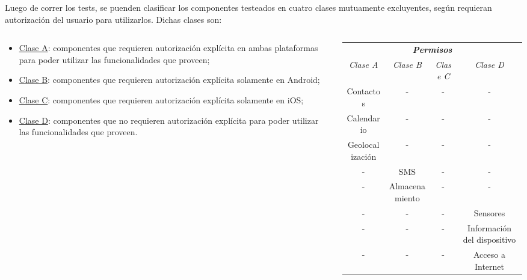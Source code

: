 \begin{frame}
Luego de correr los tests, se puenden clasificar los componentes testeados en cuatro clases mutuamente excluyentes, según requieran autorización del usuario para utilizarlos. \pause Dichas clases son:
\begin{columns}
  \begin{column}[]{.30\textwidth}
   \begin{tiny}
   \begin{itemize}
    \item \underline{Clase A}: componentes que requieren autorización explícita en ambas plataformas para poder utilizar las funcionalidades que proveen;
    \item \underline{Clase B}: componentes que requieren autorización explícita solamente en Android;
    \item \underline{Clase C}: componentes que requieren autorización explícita solamente en iOS;
    \item \underline{Clase D}: componentes que no requieren autorización explícita para poder utilizar las funcionalidades que proveen.
   \end{itemize}
   \end{tiny}
  \end{column}
  \begin{column}[]{.7\textwidth}
  \begin{table}[H]
    \centering
    \begin{tiny}
	\begin{tabular}{c c c c}
		\hline
		\multicolumn{4}{c}{\emph{\textbf{Permisos}}} \\
		\emph{Clase A} 	& \emph{Clase B}	 & \emph{Clase C}    & \emph{Clase D}\\ \hline \hline
    Contactos    & -    & -    & -\\
    Calendario    & -    & -    & -\\
    Geolocalización    & -    & -    & -\\
    -    & SMS & -    & -\\
    -    & Almacenamiento    & -    & -\\
    -    & -    & -    & Sensores\\
    -    & -    & -    & Información del dispositivo\\
    -    & -    & -    & Acceso a Internet\\ \hline
	\end{tabular}
	\end{tiny}
	\end{table}
  \end{column}
 \end{columns}
\end{frame}